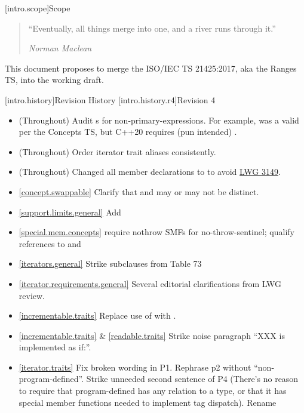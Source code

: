 [intro.scope]{Scope}

\begin{quote}
``Eventually, all things merge into one, and a river runs through it.''
\begin{flushright}
\textemdash \textit{Norman Maclean}
\end{flushright}
\end{quote}

\pnum
This document proposes to merge the ISO/IEC TS 21425:2017, aka the Ranges TS,
into the working draft.

[intro.history]{Revision History}
[intro.history.r4]{Revision 4}
\begin{itemize}
\item (Throughout) Audit s for
  non-primary-expressions. For example,  was a valid
   per the Concepts TS, but C++20 requires
  (pun intended) .
\item (Throughout) Order iterator trait aliases consistently.
\item (Throughout) Changed all  member declarations to
   to avoid \href{https://wg21.link/LWG3149}{LWG 3149}.
\item \ref{concept.swappable} Clarify that  and  may or
  may not be distinct.
\item \ref{support.limits.general} Add 
\item \ref{special.mem.concepts} require nothrow SMFs for no-throw-sentinel;
  qualify references to  and 
\item \ref{iterators.general} Strike subclauses from Table 73
\item \ref{iterator.requirements.general} Several editorial clarifications from
  LWG review.
\item \ref{incrementable.traits} Replace use of  with
  .
\item \ref{incrementable.traits} \& \ref{readable.traits} Strike noise paragraph
  ``XXX is implemented as if:''.
\item \ref{iterator.traits} Fix broken wording in P1. Rephrase p2 without
  ``non-program-defined''. Strike unneeded second sentence of P4
  (There's no reason to require that program-defined 
  has any relation to a  type, or that it has special member
  functions needed to implement tag dispatch). Rename 

\end{itemize}
